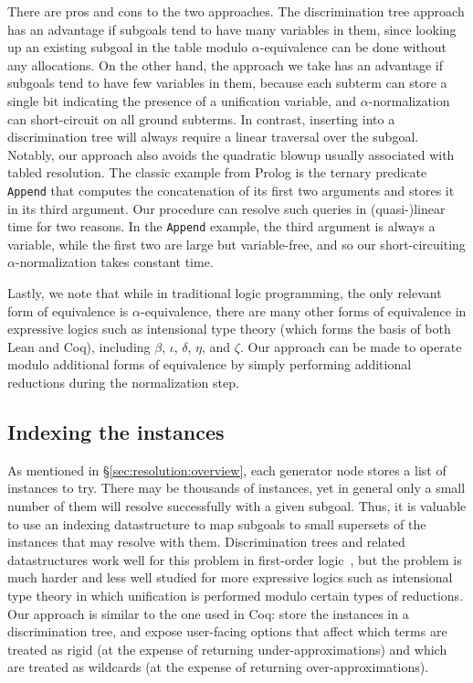 \documentclass[runningheads]{llncs}
\begin{document}
There are pros and cons to the two approaches. The discrimination tree approach has an advantage if subgoals
tend to have many variables in them, since looking up an existing subgoal in the table modulo $\alpha$-equivalence can be done without any allocations.
On the other hand, the approach we take has an advantage if subgoals tend to have few variables in them, because
each subterm can store a single bit indicating the presence of a unification variable, and $\alpha$-normalization can short-circuit on all
ground subterms. In contrast, inserting into a discrimination tree will always require a linear traversal over the subgoal.
Notably, our approach also avoids the quadratic blowup usually associated with tabled resolution.
The classic example from Prolog is the ternary predicate \lstinline{Append} that
computes the concatenation of its first two arguments and stores it in its third argument.
Our procedure can resolve such queries in (quasi-)linear time for two reasons.
In the \lstinline{Append} example, the third argument is always a variable,
while the first two are large but variable-free, and so our short-circuiting $\alpha$-normalization takes constant time.

Lastly, we note that while in traditional logic programming, the only relevant form of equivalence is $\alpha$-equivalence,
there are many other forms of equivalence in expressive logics such as intensional type theory (which forms the basis of both Lean and Coq),
including $\beta$, $\iota$, $\delta$, $\eta$, and $\zeta$.
Our approach can be made to operate modulo additional forms of equivalence by simply performing additional reductions during the normalization step.

\subsection{Indexing the instances}
\label{sec:resolution:indexing}
As mentioned in \S\ref{sec:resolution:overview}, each generator node stores a list of instances to try.
There may be thousands of instances, yet in general only a small number of them will resolve successfully with a given subgoal.
Thus, it is valuable to use an indexing datastructure to map subgoals to small supersets of the instances that may resolve with them.
Discrimination trees and related datastructures work well for this problem in first-order logic~\cite{sekar2001term},
but the problem is much harder and less well studied for more expressive logics such as intensional type theory
in which unification is performed modulo certain types of reductions.
Our approach is similar to the one used in Coq: store the instances in a discrimination tree,
and expose user-facing options that affect which terms are treated as rigid (at the expense of returning under-approximations)
and which are treated as wildcards (at the expense of returning over-approximations).
\end{document}
